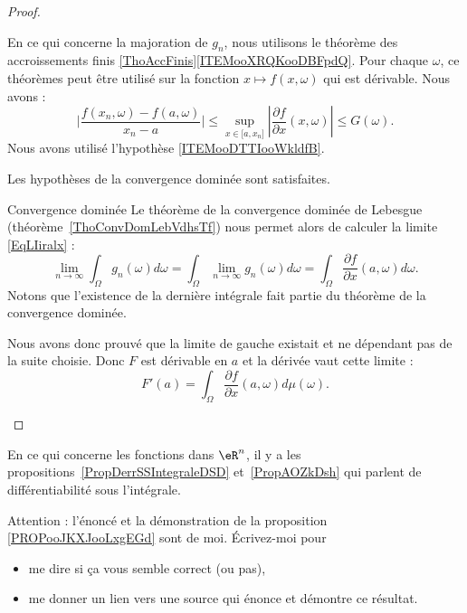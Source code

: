 \begin{proof}
\begin{subproof}
\begin{itemize}
                    En ce qui concerne la majoration de \( g_n\), nous utilisons le théorème des accroissements finis \ref{ThoAccFinis}\ref{ITEMooXRQKooDBFpdQ}. Pour chaque \( \omega\), ce théorèmes peut être utilisé sur la fonction \( x\mapsto f(x,\omega)\) qui est dérivable. Nous avons :
                    \begin{equation}
                        \big| \frac{  f(x_n,\omega)-f(a,\omega)   }{ x_n-a  } \big|\leq \sup_{x\in \mathopen[ a , x_n \mathclose]}| \frac{ \partial f }{ \partial x }(x,\omega) |\leq G(\omega). 
                    \end{equation}
                    Nous avons utilisé l'hypothèse \ref{ITEMooDTTIooWkldfB}.
            \end{itemize}
            Les hypothèses de la convergence dominée sont satisfaites.
                
            \item[Convergence dominée]
                Le théorème de la convergence dominée de Lebesgue (théorème~\ref{ThoConvDomLebVdhsTf}) nous permet alors de calculer la limite \eqref{EqLIiralx} :
                \begin{equation}
                    \lim_{n\to \infty} \int_{\Omega}g_n(\omega)d\omega=\int_{\Omega}\lim_{n\to \infty} g_n(\omega)d\omega=\int_{\Omega}\frac{ \partial f }{ \partial x }(a,\omega)d\omega.
                \end{equation}
                Notons que l'existence de la dernière intégrale fait partie du théorème de la convergence dominée.

                Nous avons donc prouvé que la limite de gauche existait et ne dépendant pas de la suite choisie. Donc \( F\) est dérivable en \( a\) et la dérivée vaut cette limite :
                \begin{equation}
                    F'(a)=\int_{\Omega}\frac{ \partial f }{ \partial x }(a,\omega)d\mu(\omega).
                \end{equation}
    \end{subproof}
\end{proof}

En ce qui concerne les fonctions dans \( \eR^n\), il y a les  propositions~\ref{PropDerrSSIntegraleDSD} et~\ref{PropAOZkDsh} qui parlent de différentiabilité sous l'intégrale.

\begin{probleme}
    Attention : l'énoncé et la démonstration de la proposition \ref{PROPooJKXJooLxgEGd} sont de moi. Écrivez-moi pour
\begin{itemize}
    \item me dire si ça vous semble correct (ou pas),
    \item me donner un lien vers une source qui énonce et démontre ce résultat.
\end{itemize}
\end{probleme}


